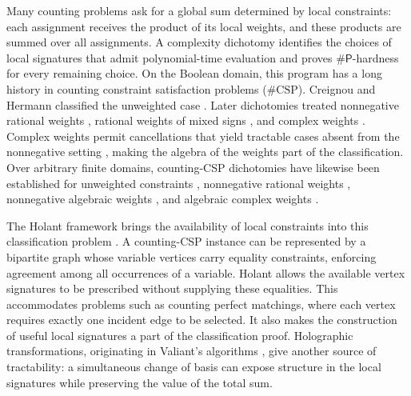 \documentclass[11pt,letterpaper,onecolumn]{article}
\theoremstyle{plain}
\theoremstyle{definition}
\theoremstyle{remark}
\newcommand{\SharpP}{\#\mathsf P}
\begin{document}
Many counting problems ask for a global sum determined by local
constraints: each assignment receives the product of its local weights,
and these products are summed over all assignments.  A complexity
dichotomy identifies the choices of local signatures that admit
polynomial-time evaluation and proves \(\SharpP\)-hardness for every
remaining choice.  On the Boolean domain, this program has a long history
in counting constraint satisfaction problems (\(\#\mathrm{CSP}\)).
Creignou and Hermann classified the unweighted case
\cite{CreignouHermann1996}.  Later dichotomies treated nonnegative rational
weights \cite{DyerGoldbergJerrum2009}, rational weights of mixed signs
\cite{BulatovDyerGoldbergJalseniusRicherby2009}, and complex weights
\cite{CaiLuXia2014}.  Complex weights permit cancellations that yield
tractable cases absent from the nonnegative setting
\cite{CaiLuXia2014}, making the algebra of the weights part of the
classification.
Over arbitrary finite domains, counting-CSP dichotomies have likewise
been established for unweighted constraints
\cite{Bulatov2013,DyerRicherby2013}, nonnegative rational weights
\cite{BulatovDyerGoldbergJalseniusJerrumRicherby2012}, nonnegative algebraic
weights \cite{CaiChenLu2016}, and algebraic complex weights
\cite{CaiChen2017}.

The Holant framework brings the availability of local constraints into
this classification problem \cite{CaiLuXia2009}.  A counting-CSP instance
can be represented by a bipartite graph whose variable vertices carry
equality constraints, enforcing agreement among all occurrences of a
variable.  Holant allows the available vertex signatures to be prescribed
without supplying these equalities.  This accommodates problems such as
counting perfect matchings, where each vertex requires exactly one
incident edge to be selected.  It also makes the construction of useful
local signatures a part of the classification proof.  Holographic
transformations, originating in Valiant's algorithms \cite{Valiant2008},
give another source of tractability: a simultaneous change of basis can
expose structure in the local signatures while preserving the value of the
total sum.
\end{document}
